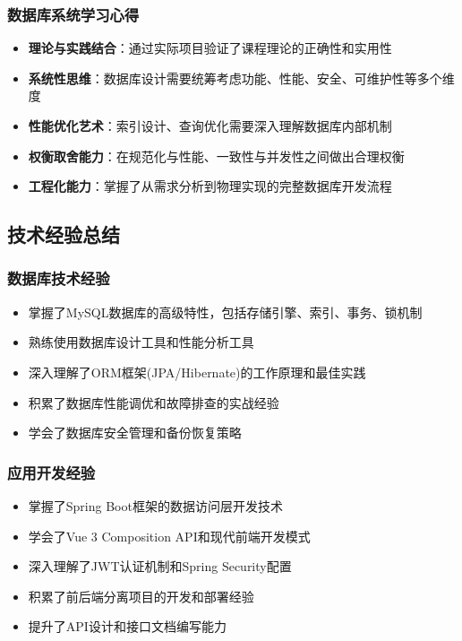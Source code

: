 \documentclass[12pt,a4paper]{article}
\begin{document}
\subsubsection{数据库系统学习心得}
\begin{itemize}
    \item \textbf{理论与实践结合}：通过实际项目验证了课程理论的正确性和实用性
    \item \textbf{系统性思维}：数据库设计需要统筹考虑功能、性能、安全、可维护性等多个维度
    \item \textbf{性能优化艺术}：索引设计、查询优化需要深入理解数据库内部机制
    \item \textbf{权衡取舍能力}：在规范化与性能、一致性与并发性之间做出合理权衡
    \item \textbf{工程化能力}：掌握了从需求分析到物理实现的完整数据库开发流程
\end{itemize}

\subsection{技术经验总结}

\subsubsection{数据库技术经验}
\begin{itemize}
    \item 掌握了MySQL数据库的高级特性，包括存储引擎、索引、事务、锁机制
    \item 熟练使用数据库设计工具和性能分析工具
    \item 深入理解了ORM框架(JPA/Hibernate)的工作原理和最佳实践
    \item 积累了数据库性能调优和故障排查的实战经验
    \item 学会了数据库安全管理和备份恢复策略
\end{itemize}

\subsubsection{应用开发经验}
\begin{itemize}
    \item 掌握了Spring Boot框架的数据访问层开发技术
    \item 学会了Vue 3 Composition API和现代前端开发模式
    \item 深入理解了JWT认证机制和Spring Security配置
    \item 积累了前后端分离项目的开发和部署经验
    \item 提升了API设计和接口文档编写能力
\end{itemize}
\end{document}
